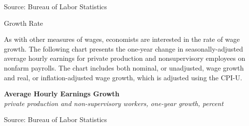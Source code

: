 \documentclass{report}
\makeatletter
\newcommand{\tbllink}[1]{\href{https://raw.githubusercontent.com/bdecon/US-chartbook/master/chartbook/data/#1}{\faTable}}
\newcommand*\short[1]{\expandafter\@gobbletwo\number\numexpr#1\relax}
\newcommand{\absnode}[3]{\node[below right, align=left] at (axis cs: #1,#2) {#3};}
\newcommand{\dateaxisticks}{
		date coordinates in=x, axis line style={draw=none},
		xmax={2023-11-30},
		max space between ticks=40,	    
		xtick={{1990-01-01}, {1992-01-01}, {1994-01-01}, 
			{1996-01-01}, {1998-01-01}, {2000-01-01}, 
			{2002-01-01}, {2004-01-01}, {2006-01-01},
			{2008-01-01}, {2010-01-01}, {2012-01-01}, {2014-01-01},
		    {2016-01-01}, {2018-01-01}, {2020-01-01}, {2022-01-01}, 
		    {2024-01-01}, {2026-01-01}},
		minor xtick={{1989-01-01}, {1991-01-01}, {1993-01-01},
			{1995-01-01}, {1997-01-01}, {1999-01-01}, 
			{2001-01-01}, {2003-01-01}, {2005-01-01}, {2007-01-01},
		    {2009-01-01}, {2011-01-01}, {2013-01-01}, {2015-01-01},
		    {2017-01-01}, {2019-01-01}, {2021-01-01}, {2023-01-01}, 
		    {2025-01-01}, {2027-01-01}},
		enlarge y limits={0.06}, enlarge x limits={0.01},
		xticklabel style={align=center, yshift=-2pt}, tick label style={inner sep=0pt},
		}
\newcommand{\bbar}[2]{extra #1 ticks = {{#2}}, extra #1 tick labels = ,
		extra #1 tick style = {grid=major, grid style={thick, black!25}},}
\newcommand{\stdline}[4]{\addplot[very thick, no markers, color=#1] 
		table [x=#2, y=#3, col sep=comma] {#4};	}
\newcommand{\rbars}{
		\fill[color=black!10] (axis cs:{1990-07-01},\pgfkeysvalueof{/pgfplots/ymin}) rectangle 
			(axis cs:{1991-03-01}, \pgfkeysvalueof{/pgfplots/ymax});
		\fill[color=black!10] (axis cs:{2007-12-01},\pgfkeysvalueof{/pgfplots/ymin}) rectangle 
			(axis cs:{2009-07-01}, \pgfkeysvalueof{/pgfplots/ymax});
		\fill[color=black!10] (axis cs:{2001-03-01},\pgfkeysvalueof{/pgfplots/ymin}) rectangle 
			(axis cs:{2001-11-01}, \pgfkeysvalueof{/pgfplots/ymax});
		\fill[color=black!10] (axis cs:{2020-02-01},\pgfkeysvalueof{/pgfplots/ymin}) rectangle 
			(axis cs:{2020-05-01}, \pgfkeysvalueof{/pgfplots/ymax});}
\makeatother
\begin{document}
{\begin{minipage}{0.4\textwidth}
\footnotesize{Source: Bureau of Labor Statistics} \hfill \tbllink{real_ahe.csv}
\end{minipage} \hspace{6mm}
\begin{minipage}{0.31\textwidth}
\small 
\end{minipage}
\vspace{4mm}

\begin{minipage}{0.76\textwidth} 
\normalsize{Growth Rate}
\vspace*{-1mm}

\small As with other measures of wages, economists are interested in the rate of wage growth. The following chart presents the one-year change in seasonally-adjusted average hourly earnings for private production and nonsupervisory employees on nonfarm payrolls. The chart includes both nominal, or unadjusted, wage growth and real, or inflation-adjusted wage growth, which is adjusted using the CPI-U.




\vspace{1mm}

\normalsize \textbf{Average Hourly Earnings Growth}\\
\footnotesize{\textit{private production and non-supervisory workers, one-year growth, percent}}
\vspace{3.1cm}

\hspace{1mm} 

\footnotesize{Source: Bureau of Labor Statistics}\vspace*{-7mm} \hfill \tbllink{ahe.csv}
\vspace{8mm}


\end{minipage}}
\end{document}
